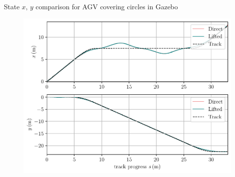 \documentclass[10pt,aspectratio=1610]{beamer} %
\begin{document}
\begin{frame}{State $x,\,y$ comparison for AGV covering circles in Gazebo}
		\begin{figure}[h!tbp]
			\includegraphics[scale=0.65]{figures/zeta_c10}
		\end{figure}

\end{frame}
\end{document}
